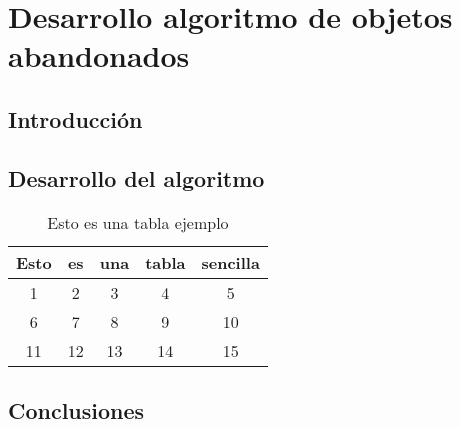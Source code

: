 
\chapter{Desarrollo algoritmo de objetos abandonados}
\label{cha:desarrollo}

\section{Introducción}
\label{sec:intro-alg-abandono}

\section{Desarrollo del algoritmo}
\label{sec:alg-abandono}


\begin{table}[!h]
\centering
\begin{tabular}{|c|c|c|c|c|}
\hline
Esto & es & una & tabla & sencilla \\ \hline
1    & 2  & 3   & 4     & 5        \\ \hline
6    & 7  & 8   & 9     & 10       \\ \hline
11   & 12 & 13  & 14    & 15       \\ \hline
\end{tabular}
\caption{Esto es una tabla ejemplo}
\label{tab:my-table}
\end{table}

\section{Conclusiones}
\label{sec:conclu-alg-abandono}